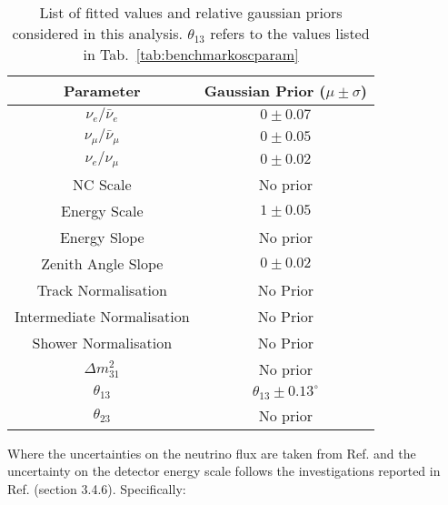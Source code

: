 \begin{table} 
	\centering
	\begin{tabular}{|c |c|} 	
		\hline
		\bf{Parameter} & \bf{Gaussian Prior ($\mu \pm \sigma$)}  \\ [0.5ex] 
		\hline
		$\nu_e/\bar{\nu}_e$ & $0 \pm 0.07$ \\ 
		\hline
		$\nu_\mu/\bar{\nu}_\mu$ & $0 \pm 0.05$ \\ 
		\hline
		$\nu_e/\nu_\mu$ & $0 \pm 0.02$ \\ 
		\hline
		NC Scale & No prior \\
		\hline
		Energy Scale & $1 \pm 0.05$\\
		\hline
		Energy Slope & No prior \\
		\hline
		Zenith Angle Slope & $0 \pm 0.02$\\
		\hline
		Track Normalisation & No Prior \\
		\hline
		Intermediate Normalisation & No Prior \\
		\hline
		Shower Normalisation & No Prior \\
		\hline
		$\Delta m_{31}^2$ & No prior \\ 
		\hline
		$\theta_{13}$ & $\theta_{13} \pm 0.13^\circ$ \\
		\hline
		$\theta_{23}$ & No prior \\[1ex]
		\hline
	\end{tabular}
	\caption{List of fitted values and relative gaussian priors considered in this analysis. $\theta_{13}$ refers to the values listed in Tab.\ \ref{tab:benchmarkoscparam}}
	\label{tab:systlist}
\end{table} 
Where the uncertainties on the neutrino flux are taken from Ref. \cite{flux_syst} and the uncertainty on the detector energy scale follows the investigations reported in Ref. \cite{loi} (section 3.4.6). Specifically:
